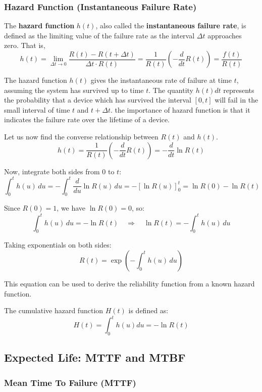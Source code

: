 \documentclass[twoside]{book}
\begin{document}
\subsubsection{Hazard Function (Instantaneous Failure Rate)}

The \textbf{hazard function} $h(t)$, also called the \textbf{instantaneous failure rate}, is defined as the limiting value of the failure rate as the interval $\Delta t$ approaches zero. That is,
\[
h(t) = \lim_{\Delta t \to 0} \dfrac{R(t) - R(t+\Delta t)}{\Delta t \cdot R(t)} = \dfrac{1}{R(t)} \left(-\dfrac{d}{dt} R(t) \right) = \dfrac{f(t)}{R(t)}
\]

The hazard function $h(t)$ gives the instantaneous rate of failure at time $t$, assuming the system has survived up to time $t$.
The quantity $h(t)dt$ represents the probability that a device which has survived the interval $[0,t]$ will fail in the small interval of time $t$ and $t+\Delta t$. the importance of hazard function is that it indicates the failure rate over the lifetime of a device.

Let us now find the converse relationship between $R(t)$ and $h(t)$.
$$h(t)=\dfrac{1}{R(t)} \left(-\dfrac{d}{dt} R(t) \right) = -\dfrac{d}{dt} \ln R(t)$$

Now, integrate both sides from \(0\) to \(t\):
\[
\int_0^t h(u)\,du = -\int_0^t \frac{d}{du} \ln R(u)\,du = -\left[ \ln R(u) \right]_0^t = \ln R(0) - \ln R(t)
\]

Since \( R(0) = 1 \), we have \( \ln R(0) = 0 \), so:
\[
\int_0^t h(u)\,du = -\ln R(t)
\quad \Rightarrow \quad
\ln R(t) = -\int_0^t h(u)\,du
\]

Taking exponentials on both sides:
\[
R(t) = \exp\left( -\int_0^t h(u)\,du \right)
\]

This equation can be used to derive the reliability function from a known hazard function.

The cumulative hazard function $H(t)$ is defined as:
\begin{equation*}
H(t) = \int_0^t h(u) du = -\ln R(t)
\end{equation*}

\subsection{Expected Life: MTTF and MTBF}

\subsubsection{Mean Time To Failure (MTTF)}
\end{document}
